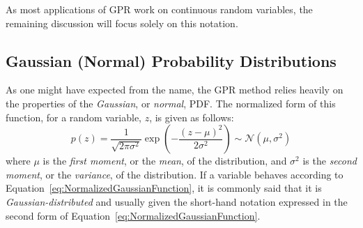 \documentclass{article}
\begin{document}
As most applications of GPR work on continuous random variables, the remaining discussion will focus solely on this notation.

\subsection{Gaussian (Normal) Probability Distributions}
\label{subsec:GaussianPDF}

As one might have expected from the name, the GPR method relies heavily on the properties of the \emph{Gaussian}, or \emph{normal}, PDF. The normalized form of this function, for a random variable, $z$, is given as follows:
\begin{equation}
\label{eq:NormalizedGaussianFunction}
	p\!\left(z\right) = \frac{1}{\sqrt{2 \pi \sigma^2}} \exp\!\left(-\frac{\left(z - \mu\right)^2}{2 \sigma^2}\right) \sim \mathcal{N}\!\left(\mu,\sigma^2\right)
\end{equation}
where $\mu$ is the \emph{first moment}, or the \emph{mean}, of the distribution, and $\sigma^2$ is the \emph{second moment}, or the \emph{variance}, of the distribution. If a variable behaves according to Equation~\eqref{eq:NormalizedGaussianFunction}, it is commonly said that it is \emph{Gaussian-distributed} and usually given the short-hand notation expressed in the second form of Equation~\eqref{eq:NormalizedGaussianFunction}.
\end{document}
